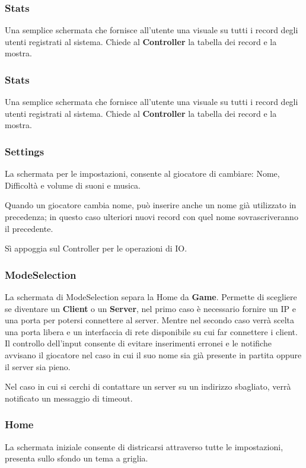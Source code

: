     \subsubsection{Stats}
        Una semplice schermata che fornisce all'utente una visuale su tutti i record degli utenti registrati al sistema.
        Chiede al \textbf{Controller} la tabella dei record e la mostra.
        \subsubsection{Stats}
        Una semplice schermata che fornisce all'utente una visuale su tutti i record degli utenti registrati al sistema.
        Chiede al \textbf{Controller} la tabella dei record e la mostra.

    \subsubsection{Settings}
        La schermata per le impostazioni, consente al giocatore di cambiare: Nome, Difficoltà e volume di suoni e musica.
        
        Quando un giocatore cambia nome, può inserire anche un nome già utilizzato in precedenza; in questo caso ulteriori nuovi 
        record con quel nome sovrascriveranno il precedente.
        
        Sì appoggia sul Controller per le operazioni di IO.
    
    \subsubsection{ModeSelection}
        La schermata di ModeSelection separa la Home da \textbf{Game}.
        Permette di scegliere se diventare un \textbf{Client} o un \textbf{Server}, nel primo caso è necessario fornire un IP e una porta per potersi connettere al server.
        Mentre nel secondo caso verrà scelta una porta libera e un interfaccia di rete disponibile su cui far connettere i client.
        Il controllo dell'input consente di evitare inserimenti erronei e le notifiche avvisano il giocatore nel caso in cui il suo nome sia già presente in partita oppure il server sia pieno.
        
        Nel caso in cui si cerchi di contattare un server su un indirizzo sbagliato, verrà notificato un messaggio di timeout.
        
    \subsubsection{Home}
        La schermata iniziale consente di districarsi attraverso tutte le impostazioni, presenta sullo sfondo un tema a griglia.
    

